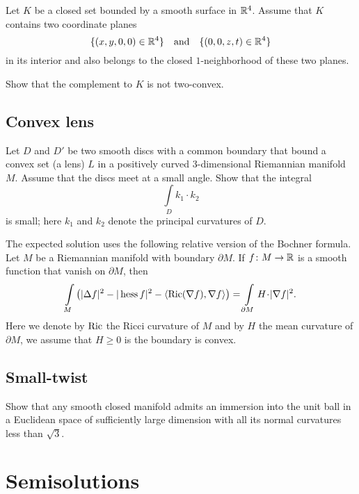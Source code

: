 \begin{pr}
Let $K$ be a closed set bounded by a smooth surface
in $\mathbb{R}^4$.
Assume that $K$ contains two coordinate planes 
$$\{(x,y,0,0)\in\mathbb{R}^4\}
\quad
\text{and}
\quad
\{(0,0,z,t)\in\mathbb{R}^4\}$$
in its interior 
and also belongs to the closed $1$-neighborhood of these two planes.

Show that the complement to $K$ is not two-convex.
\end{pr}


\subsection*{Convex lens\thm}
\label{Convex lens}

\begin{pr} Let $D$ and $D'$ be two smooth discs with a common boundary that bound a convex set (a lens) $L$ in a positively curved 3-dimensional Riemannian manifold $M$.
Assume that the discs meet at a small angle.
Show that the integral 
\[\int\limits_{D}k_1\cdot k_2\]
is small; here $k_1$ and $k_2$ denote the principal curvatures of $D$.
\end{pr}

The expected solution uses the following relative version of the Bochner formula.
Let $M$ be a Riemannian manifold with boundary $\partial M$.
If $f\colon M\to \mathbb{R}$ is a smooth function that vanish on $\partial M$,
then 
\[\int\limits_M \left(|\Delta f|^2
-|\Hess f|^2
-\langle\mathrm{Ric}(\nabla f),\nabla f\rangle\right)
=\int\limits_{\partial M}
H\cdot|\nabla f|^2.\]
Here we denote by $\operatorname{\rm Ric}$ the Ricci curvature of $M$ 
and by $H$ the mean curvature of $\partial M$, we assume that $H\ge 0$ is the boundary is convex.


\subsection*{Small-twist}
\label{Small-twist}

\begin{pr}
Show that any smooth closed manifold admits an immersion into the unit ball in a Euclidean space of sufficiently large dimension
with all its normal curvatures less than $\sqrt{3}$.
\end{pr}


\section*{Semisolutions}



